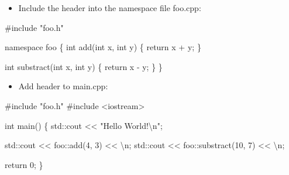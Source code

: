 \documentclass[
  letterpaper,
  DIV=11,
  numbers=noendperiod]{scrreprt}
\newenvironment{Shaded}{\begin{snugshade}}{\end{snugshade}}
\newcommand{\CommentTok}[1]{\textcolor[rgb]{0.37,0.37,0.37}{#1}}
\newcommand{\DecValTok}[1]{\textcolor[rgb]{0.68,0.00,0.00}{#1}}
\newcommand{\ErrorTok}[1]{\textcolor[rgb]{0.68,0.00,0.00}{#1}}
\newcommand{\FunctionTok}[1]{\textcolor[rgb]{0.28,0.35,0.67}{#1}}
\newcommand{\NormalTok}[1]{\textcolor[rgb]{0.00,0.23,0.31}{#1}}
\newcommand{\SpecialCharTok}[1]{\textcolor[rgb]{0.37,0.37,0.37}{#1}}
\newcommand{\StringTok}[1]{\textcolor[rgb]{0.13,0.47,0.30}{#1}}
\providecommand{\tightlist}{%
  \setlength{\itemsep}{0pt}\setlength{\parskip}{0pt}}\usepackage{longtable,booktabs,array}
\begin{document}
\begin{itemize}
\tightlist
\item
  Include the header into the namespace file foo.cpp:
\end{itemize}

\begin{Shaded}
\begin{Highlighting}[]
\CommentTok{\#include "foo.h"}

\NormalTok{namespace foo}
\NormalTok{\{}
\NormalTok{    int }\FunctionTok{add}\NormalTok{(int x, int y)}
\NormalTok{    \{}
\NormalTok{        return x }\SpecialCharTok{+}\NormalTok{ y;}
\NormalTok{    \}}

\NormalTok{    int }\FunctionTok{substract}\NormalTok{(int x, int y)}
\NormalTok{    \{}
\NormalTok{        return x }\SpecialCharTok{{-}}\NormalTok{ y;}
\NormalTok{    \}}
\NormalTok{\}}
\end{Highlighting}
\end{Shaded}

\begin{itemize}
\tightlist
\item
  Add header to main.cpp:
\end{itemize}

\begin{Shaded}
\begin{Highlighting}[]
\CommentTok{\#include "foo.h"}
\CommentTok{\#include \textless{}iostream\textgreater{}}

\NormalTok{int }\FunctionTok{main}\NormalTok{()}
\NormalTok{\{}
\NormalTok{    std}\SpecialCharTok{::}\NormalTok{cout }\SpecialCharTok{\textless{}}\ErrorTok{\textless{}} \StringTok{"Hello World!}\SpecialCharTok{\textbackslash{}n}\StringTok{"}\NormalTok{;}

\NormalTok{    std}\SpecialCharTok{::}\NormalTok{cout }\SpecialCharTok{\textless{}}\ErrorTok{\textless{}}\NormalTok{ foo}\SpecialCharTok{::}\FunctionTok{add}\NormalTok{(}\DecValTok{4}\NormalTok{, }\DecValTok{3}\NormalTok{) }\SpecialCharTok{\textless{}}\ErrorTok{\textless{}} \StringTok{\textquotesingle{}}\SpecialCharTok{\textbackslash{}n}\StringTok{\textquotesingle{}}\NormalTok{;}
\NormalTok{    std}\SpecialCharTok{::}\NormalTok{cout }\SpecialCharTok{\textless{}}\ErrorTok{\textless{}}\NormalTok{ foo}\SpecialCharTok{::}\FunctionTok{substract}\NormalTok{(}\DecValTok{10}\NormalTok{, }\DecValTok{7}\NormalTok{) }\SpecialCharTok{\textless{}}\ErrorTok{\textless{}} \StringTok{\textquotesingle{}}\SpecialCharTok{\textbackslash{}n}\StringTok{\textquotesingle{}}\NormalTok{;}
    
\NormalTok{    return }\DecValTok{0}\NormalTok{;}
\NormalTok{\}}
\end{Highlighting}
\end{Shaded}
\end{document}
